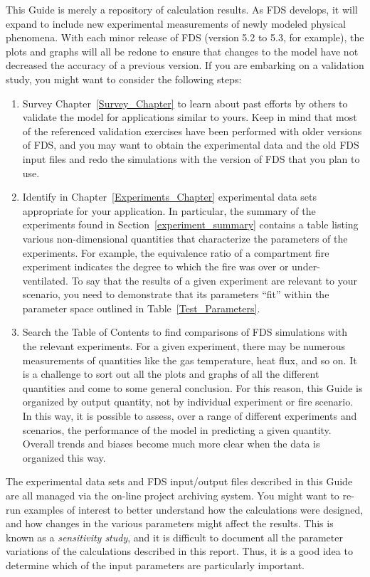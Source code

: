 This Guide is merely a repository of calculation results. As FDS develops, it will expand to include new experimental
measurements of newly modeled physical phenomena. With each minor release of FDS (version 5.2 to 5.3, for example),
the plots and graphs will all be redone to ensure that changes to the model have not decreased the accuracy of a
previous version. If you are embarking on a validation study, you might want to consider the following steps:
\begin{enumerate}
\item Survey Chapter~\ref{Survey_Chapter} to learn about past efforts by others to validate the model for
applications similar to yours. Keep in mind that most of the referenced validation exercises have been performed with
older versions of FDS, and you may want to obtain the experimental data and the old FDS input files and redo the
simulations with the version of FDS that you plan to use.
\item Identify in Chapter~\ref{Experiments_Chapter} experimental data sets appropriate for your application. In particular,
the summary of the experiments found in Section~\ref{experiment_summary} contains a table listing various non-dimensional
quantities that characterize the parameters of the experiments. For example, the equivalence ratio of a compartment fire
experiment indicates the degree to which the fire was over or under-ventilated.
To say that the results of a given experiment are relevant to
your scenario, you need to demonstrate that its parameters ``fit'' within the parameter space outlined in
Table~\ref{Test_Parameters}.
\item Search the Table of Contents to find comparisons of FDS simulations with the relevant experiments.
For a given experiment, there may be numerous measurements of quantities like the gas temperature,
heat flux, and so on.
It is a challenge to sort out all the plots and graphs of all the different quantities and come to some general conclusion.
For this reason, this Guide is organized by output quantity, not by individual experiment or fire scenario.
In this way, it is possible to assess, over a range of
different experiments and scenarios, the performance of the model in predicting a given quantity.
Overall trends and biases become much more clear when the data is organized this way.
\end{enumerate}
The experimental data sets and FDS input/output files described in this Guide are all managed via the on-line project archiving system.
You might want to re-run examples of interest
to better understand how the calculations were designed, and how changes in the various parameters might affect the results.
This is known as a {\em sensitivity study},
and it is difficult to document all the parameter variations of the calculations described in this report.
Thus, it is a good idea to determine which of the input parameters are particularly important.



